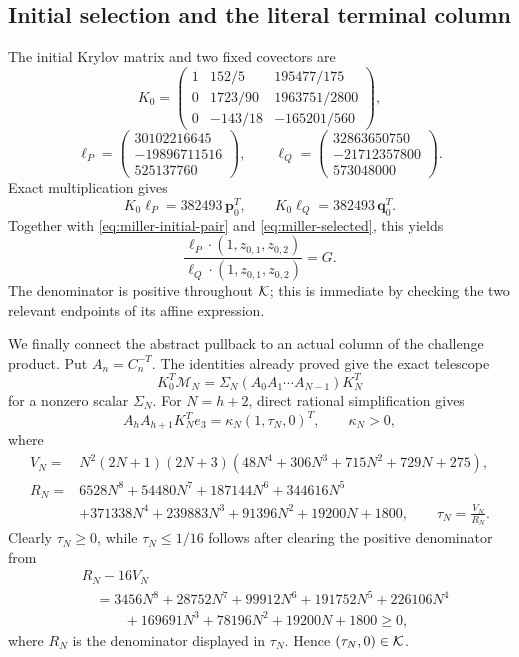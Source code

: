 \subsection{Initial selection and the literal terminal column}

The initial Krylov matrix and two fixed covectors are
\[
K_0=\begin{pmatrix}
1&152/5&195477/175\\
0&1723/90&1963751/2800\\
0&-143/18&-165201/560
\end{pmatrix},
\]
\[
\ell_P=\begin{pmatrix}30102216645\\-19896711516\\525137760\end{pmatrix},
\qquad
\ell_Q=\begin{pmatrix}32863650750\\-21712357800\\573048000\end{pmatrix}.
\]
Exact multiplication gives
\begin{equation}\label{eq:miller-covectors}
 K_0\ell_P=382493\,\boldsymbol p_0^T,\qquad
 K_0\ell_Q=382493\,\boldsymbol q_0^T.
\end{equation}
Together with \eqref{eq:miller-initial-pair} and
\eqref{eq:miller-selected}, this yields
\begin{equation}\label{eq:miller-graph-value}
 \frac{\ell_P\cdot(1,z_{0,1},z_{0,2})}
      {\ell_Q\cdot(1,z_{0,1},z_{0,2})}=G.
\end{equation}
The denominator is positive throughout ${\cal K}$; this is immediate by
checking the two relevant endpoints of its affine expression.

We finally connect the abstract pullback to an actual column of the
challenge product.  Put $A_n=C_n^{-T}$.  The identities already proved give
the exact telescope
\begin{equation}\label{eq:miller-telescope}
 K_0^T\mathcal M_N
   =\Sigma_N(A_0A_1\cdots A_{N-1})K_N^T
\end{equation}
for a nonzero scalar $\Sigma_N$.  For $N=h+2$, direct rational
simplification gives
\begin{equation}\label{eq:miller-terminal}
 A_hA_{h+1}K_N^Te_3
       =\kappa_N(1,\tau_N,0)^T,\qquad \kappa_N>0,
\end{equation}
where
\[
\begin{aligned}
V_N={}&N^2(2N+1)(2N+3)
 (48N^4+306N^3+715N^2+729N+275),\\
R_N={}&6528N^8+54480N^7+187144N^6+344616N^5\\
 &+371338N^4+239883N^3+91396N^2+19200N+1800,
\qquad \tau_N=\frac{V_N}{R_N}.
\end{aligned}
\]
Clearly $\tau_N\geq0$, while $\tau_N\leq1/16$ follows after clearing the
positive denominator from
\begin{align*}
&R_N-16V_N\\
&\quad=3456N^8+28752N^7+99912N^6+191752N^5+226106N^4\\
&\qquad\quad+169691N^3+78196N^2+19200N+1800\geq0,
\end{align*}
where $R_N$ is the denominator displayed in $\tau_N$.  Hence
$(\tau_N,0)\in{\cal K}$.

